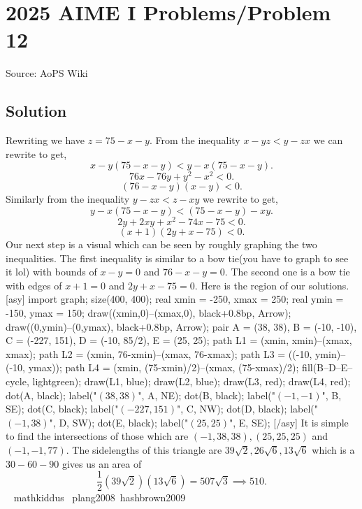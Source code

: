 \documentclass[12pt]{article}
\begin{document}
\section*{{2025 AIME I Problems/Problem 12}}
Source: AoPS Wiki

\subsection*{Solution}
Rewriting we have $z=75-x-y.$ From the inequality $x-yz<y-zx$ we can rewrite to get, \[x-y(75-x-y)< y-x(75-x-y).\] \[76x-76y+y^2-x^2<0.\] \[(76-x-y)(x-y)<0.\] Similarly from the inequality $y-zx<z-xy$ we rewrite to get, \[y-x(75-x-y)<(75-x-y)-xy.\] \[2y + 2xy + x^2 - 74x - 75 < 0.\] \[(x + 1)(2y + x - 75) < 0.\] Our next step is a visual which can be seen by roughly graphing the two inequalities. The first inequality is similar to a bow tie(you have to graph to see it lol) with bounds of $x-y=0$ and $76-x-y=0.$ The second one is a bow tie with edges of $x+1=0$ and $2y+x-75=0.$ Here is the region of our solutions. [asy] import graph; size(400, 400); real xmin = -250, xmax = 250; real ymin = -150, ymax = 150; draw((xmin,0)--(xmax,0), black+0.8bp, Arrow); draw((0,ymin)--(0,ymax), black+0.8bp, Arrow); pair A = (38, 38), B = (-10, -10), C = (-227, 151), D = (-10, 85/2), E = (25, 25); path L1 = (xmin, xmin)--(xmax, xmax); path L2 = (xmin, 76-xmin)--(xmax, 76-xmax); path L3 = ((-10, ymin)--(-10, ymax)); path L4 = (xmin, (75-xmin)/2)--(xmax, (75-xmax)/2); fill(B--D--E--cycle, lightgreen); draw(L1, blue); draw(L2, blue); draw(L3, red); draw(L4, red); dot(A, black); label("$(38,38)$", A, NE); dot(B, black); label("$(-1,-1)$", B, SE); dot(C, black); label("$(-227,151)$", C, NW); dot(D, black); label("$(-1,38)$", D, SW); dot(E, black); label("$(25,25)$", E, SE); [/asy] It is simple to find the intersections of those which are $(-1,38,38),(25,25,25)$ and $(-1,-1,77).$ The sidelengths of this triangle are $39\sqrt{2},26\sqrt{6},13\sqrt{6}$ which is a $30-60-90$ gives us an area of \[\frac{1}{2}(39\sqrt{2})(13\sqrt{6})=507\sqrt{3}\implies\boxed{510}.\] ~ mathkiddus ~plang2008~hashbrown2009
\end{document}
